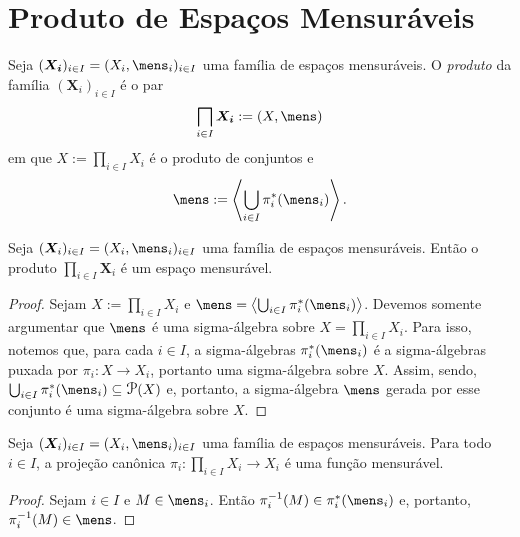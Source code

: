\section{Produto de Espaços Mensuráveis}

\begin{defi}
Seja $(\bm{X_i})_{i \in I} = (X_i,\mens_i)_{i \in I}$ uma família de espaços mensuráveis. O \emph{produto} da família $(\bm X_i)_{i \in I}$ é o par
	\begin{equation*}
	\prod_{i \in I} \bm{X_i} := (X,\mens)
	\end{equation*}
em que $X := \prod_{i \in I} X_i$ é o produto de conjuntos e
	\begin{equation*}
	\mens := \ger{\bigcup_{i \in I} \pi_i^*(\mens_i)}.
	\end{equation*}
\end{defi}

\begin{prop}
Seja $(\bm X_i)_{i \in I} = (X_i,\mens_i)_{i \in I}$ uma família de espaços mensuráveis. Então o produto $\prod_{i \in I} \bm X_i$ é um espaço mensurável.
\end{prop}
\begin{proof}
Sejam $X := \prod_{i \in I} X_i$ e $\mens=\ger{\bigcup_{i \in I} \pi_i^*(\mens_i)}$. Devemos somente argumentar que $\mens$ é uma sigma-álgebra sobre $X= \prod_{i \in I} X_i$. Para isso, notemos que, para cada $i \in I$, a sigma-álgebras $\pi_i^*(\mens_i)$ é a sigma-álgebras puxada por $\pi_i: X \to X_i$, portanto uma sigma-álgebra sobre $X$. Assim, sendo, $\bigcup_{i \in I} \pi_i^*(\mens_i) \subseteq \p(X)$ e, portanto, a sigma-álgebra $\mens$ gerada por esse conjunto é uma sigma-álgebra sobre $X$.
\end{proof}

\begin{prop}
Seja $(\bm X_i)_{i \in I} = (X_i,\mens_i)_{i \in I}$ uma família de espaços mensuráveis. Para todo $i \in I$, a projeção canônica $\pi_i: \prod_{i \in I} X_i \to X_i$ é uma função mensurável.
\end{prop}
\begin{proof}
Sejam $i \in I$ e $M \in \mens_i$. Então $\pi_i\inv(M) \in \pi_i^*(\mens_i)$ e, portanto, $\pi_i\inv(M) \in \mens$.
\end{proof}

